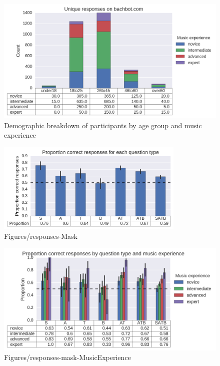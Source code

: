 \documentclass[dissertation.tex]{subfiles}
\begin{document}
\begin{figure}[htpb]
  \centering
  \includegraphics[width=\textwidth]{Figures/responses-ageGroup-musicExperience.png}
  \caption{Demographic breakdown of participants by age group and music experience}
  \label{fig:responses-ageGroup-musicExperience}
\end{figure}

\begin{figure}[htpb]
  \centering
  \includegraphics[width=0.8\textwidth]{Figures/responses-mask.png}
  \caption{Figures/responses-Mask}
  \label{fig:responses-mask}
\end{figure}

\begin{figure}[htpb]
  \centering
  \includegraphics[width=1.0\textwidth]{Figures/responses-mask-musicExperience.png}
  \caption{Figures/responses-mask-MusicExperience}
  \label{fig:responses-mask-musicExperience}
\end{figure}
\end{document}

